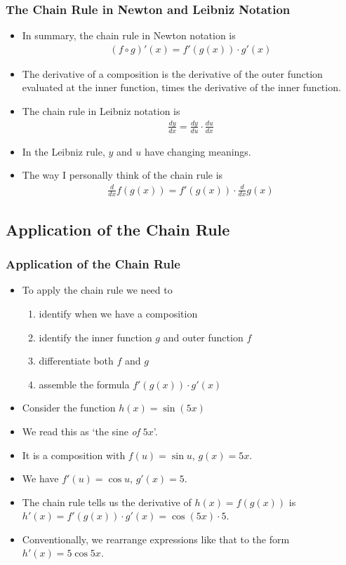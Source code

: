 \documentclass[serif,ignorenonframetext]{beamer}
\begin{document}
\begin{frame}
  \frametitle{The Chain Rule in Newton and Leibniz Notation}
  \begin{itemize}[<+->]
  \item In summary, the chain rule in Newton notation is 
    \begin{align*}
      (f \circ g)'(x) = f'(g(x)) \cdot g'(x)
    \end{align*}
  \item The derivative of a composition is the derivative of the outer function
    evaluated at the inner function, times the derivative of the inner function.
  \item The chain rule in Leibniz notation is
    \begin{align*}
      \frac{dy}{dx} = \frac{dy}{du} \cdot \frac{du}{dx}
    \end{align*}
  \item In the Leibniz rule, $y$ and $u$ have changing meanings.
  \item The way I personally think of the chain rule is
    \begin{align*}
      \frac{d}{dx} f(g(x)) = f'(g(x)) \cdot \frac{d}{dx} g(x)
    \end{align*}
  \end{itemize}
\end{frame}


\subsection{Application of the Chain Rule}

\begin{frame}
  \frametitle{Application of the Chain Rule}
  \begin{itemize}[<+->]
  \item To apply the chain rule we need to
    \begin{enumerate}[<+->]
    \item identify when we have a composition
    \item identify the inner function $g$ and outer function $f$
    \item differentiate both $f$ and $g$
    \item assemble the formula $f'(g(x)) \cdot g'(x)$
    \end{enumerate}
  \item Consider the function $h(x)=\sin (5x)$
  \item We read this as `the sine \emph{of} $5x$'.
  \item It is a composition with $f(u)=\sin u$, $g(x)=5x$.
  \item We have $f'(u)=\cos u$, $g'(x)=5$.
  \item The chain rule tells us the derivative of $h(x)=f(g(x))$ is
    $h'(x)=f'(g(x))\cdot g'(x) = \cos(5x) \cdot 5$.
  \item Conventionally, we rearrange expressions like that to the form
    $h'(x)=5\cos 5x$.
  \end{itemize}
\end{frame}
\end{document}
